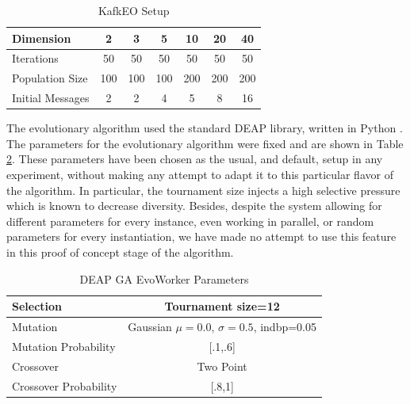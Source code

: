 \documentclass[sigconf]{acmart}
\begin{document}
\begin{table}
  \small
  \caption{KafkEO Setup}
  \label{tab:params:kafka} 
  \centering
  \small
  \begin{tabular}{|l|c|c|c|c|c|c|}
    \hline
    Dimension & 2 & 3 & 5 & 10 & 20 & 40\\ \hline
    Iterations & 50 & 50 & 50 & 50 & 50 & 50\\ \hline
    Population Size  & 100 & 100 & 100 & 200 & 200 & 200 \\ \hline
    Initial Messages & 2 & 2 & 4 & 5 & 8 & 16  \\ \hline
  \end{tabular}
\end{table}

The evolutionary algorithm used the standard DEAP library, written in
Python \cite{fortin2012deap}. The parameters for the evolutionary algorithm were fixed and
are shown in Table \ref{tab:GAparams}. These parameters have been
chosen as the usual, and default, setup in any experiment, without
making any attempt to adapt it to this particular flavor of the
algorithm. In particular, the tournament size injects a high selective
pressure which is known to decrease diversity. Besides, despite the
system allowing for different parameters for every instance, even
working in parallel, or random parameters for every instantiation, we
have made no attempt to use this feature in this proof of concept
stage of the algorithm. 
%
\begin{table}
  \small
  \caption{ DEAP GA EvoWorker Parameters }
  \label{tab:GAparams} 
  \centering
  \small
  \begin{tabular}{|l|c|}
    \hline
    Selection & Tournament size=12\\ \hline
    Mutation & Gaussian $\mu=0.0$, $\sigma=0.5$, indbp=0.05  \\ \hline
    Mutation Probability & [.1,.6]  \\ \hline
    Crossover & Two Point  \\ \hline
    Crossover Probability& [.8,1]  \\ \hline
  \end{tabular}
\end{table}
\end{document}
